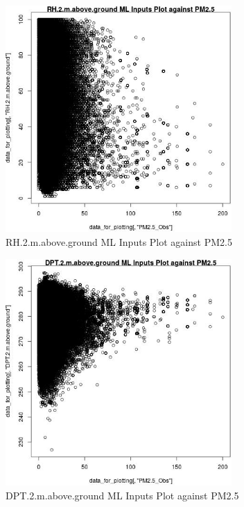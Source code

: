 \begin{figure} 
\centering  
\includegraphics[width=0.77\textwidth]{Code_Outputs/ML_input_report_ML_input_PM25_Step5_part_d_de_duplicated_aves_ML_input_RH2mabovegroundvPM25_Obs.jpg} 
\caption{\label{fig:ML_input_report_ML_input_PM25_Step5_part_d_de_duplicated_aves_ML_inputRH2mabovegroundvPM25_Obs}RH.2.m.above.ground ML Inputs Plot against PM2.5} 
\end{figure} 
 

\begin{figure} 
\centering  
\includegraphics[width=0.77\textwidth]{Code_Outputs/ML_input_report_ML_input_PM25_Step5_part_d_de_duplicated_aves_ML_input_DPT2mabovegroundvPM25_Obs.jpg} 
\caption{\label{fig:ML_input_report_ML_input_PM25_Step5_part_d_de_duplicated_aves_ML_inputDPT2mabovegroundvPM25_Obs}DPT.2.m.above.ground ML Inputs Plot against PM2.5} 
\end{figure} 
 

